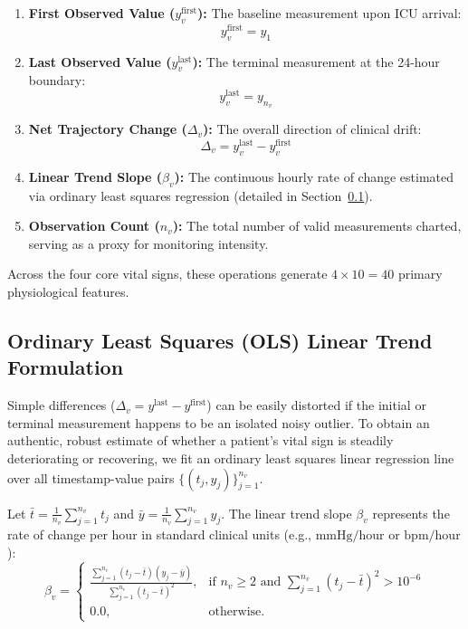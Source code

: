 \begin{enumerate}
    \item \textbf{First Observed Value ($y_v^{\text{first}}$):} The baseline measurement upon ICU arrival:
    \begin{equation}
    y_v^{\text{first}} = y_1
    \end{equation}
    
    \item \textbf{Last Observed Value ($y_v^{\text{last}}$):} The terminal measurement at the 24-hour boundary:
    \begin{equation}
    y_v^{\text{last}} = y_{n_v}
    \end{equation}
    
    \item \textbf{Net Trajectory Change ($\Delta_v$):} The overall direction of clinical drift:
    \begin{equation}
    \Delta_v = y_v^{\text{last}} - y_v^{\text{first}}
    \end{equation}
    
    \item \textbf{Linear Trend Slope ($\beta_v$):} The continuous hourly rate of change estimated via ordinary least squares regression (detailed in Section~\ref{subsec:ols_trend}).
    
    \item \textbf{Observation Count ($n_v$):} The total number of valid measurements charted, serving as a proxy for monitoring intensity.
\end{enumerate}

Across the four core vital signs, these operations generate $4 \times 10 = 40$ primary physiological features.

\subsection{Ordinary Least Squares (OLS) Linear Trend Formulation}
\label{subsec:ols_trend}

Simple differences ($\Delta_v = y^{\text{last}} - y^{\text{first}}$) can be easily distorted if the initial or terminal measurement happens to be an isolated noisy outlier. To obtain an authentic, robust estimate of whether a patient's vital sign is steadily deteriorating or recovering, we fit an ordinary least squares linear regression line over all timestamp-value pairs $\{(t_j, y_j)\}_{j=1}^{n_v}$.

Let $\bar{t} = \frac{1}{n_v} \sum_{j=1}^{n_v} t_j$ and $\bar{y} = \frac{1}{n_v} \sum_{j=1}^{n_v} y_j$. The linear trend slope $\beta_v$ represents the rate of change per hour in standard clinical units (e.g., $\text{mmHg}/\text{hour}$ or $\text{bpm}/\text{hour}$):
\begin{equation}
\label{eq:ols_slope}
\beta_v = 
\begin{cases}
\frac{\sum_{j=1}^{n_v} (t_j - \bar{t})(y_j - \bar{y})}{\sum_{j=1}^{n_v} (t_j - \bar{t})^2}, & \text{if } n_v \ge 2 \text{ and } \sum_{j=1}^{n_v} (t_j - \bar{t})^2 > 10^{-6} \\
0.0, & \text{otherwise.}
\end{cases}
\end{equation}

